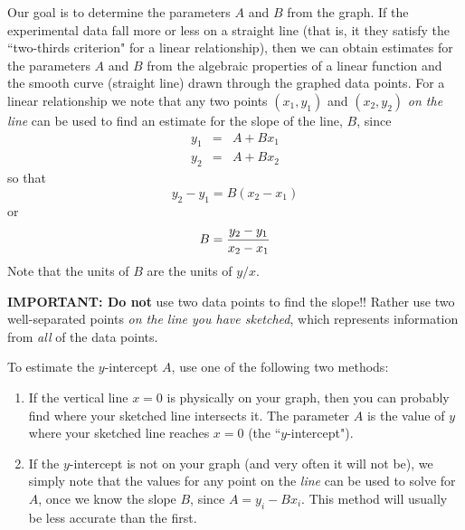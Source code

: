  Our goal is to determine the parameters $A$ and $B$ from the
graph.  If the experimental data fall more or less on a straight
line (that is, it they satisfy the ``two-thirds criterion" for
a linear relationship), then we can obtain estimates for the
parameters $A$ and $B$ from the algebraic properties of a linear
function and the smooth curve (straight line) drawn through the
graphed data points.  For a linear relationship we note that any
two points $(x_{1}, y_{1})$ and $(x_{2}, y_{2})$ {\em on the line} can be used
to find an estimate for the slope of the line, $B$, since
\begin{eqnarray*}
y_{1} & = & A + Bx_{1} \\
y_{2} & = & A + Bx_{2}
\end{eqnarray*}
so that
\[
y_{2} - y_{1} = B(x_{2} - x_{1})
\]
 or
\[
B = {{y_{2} - y_{1}} \over {x_{2} - x_{1}}}
\]
Note that the units of $B$ are the units of $y/x$.

{\bf IMPORTANT: Do not} use two data points to find the slope!!
Rather use two well-separated points {\em on the line you have sketched}, which
represents information from {\em all} of the data points.

To estimate the $y$-intercept $A$, use one of the
following two methods: \begin{enumerate}
\item If the vertical line $x=0$ is physically on your graph,
then you can probably find where your sketched line intersects it.
The parameter $A$ is the
           value of $y$ where your sketched line
reaches $x=0$ (the ``$y$-intercept").
\item If the $y$-intercept is not on your graph (and very
           often it will not be), we simply note that the values
           for any point on the {\em line} can be used to solve for $A$,
           once we know the slope $B$, since $A = y_{i} - Bx_{i}$.
This method will usually be less accurate than the first.
\end{enumerate}

